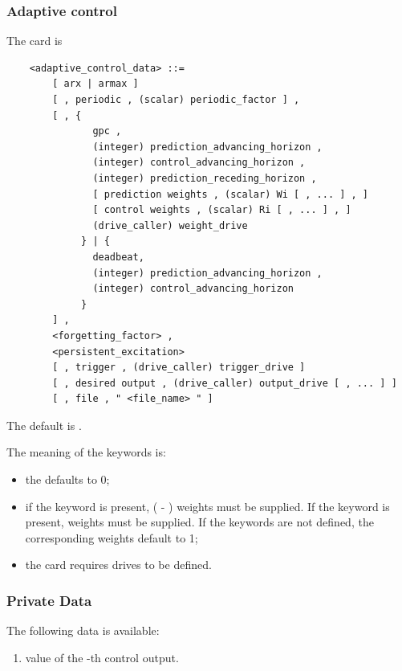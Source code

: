 \subsubsection{Adaptive control}
The  card is
\begin{verbatim}
    <adaptive_control_data> ::=
        [ arx | armax ]
        [ , periodic , (scalar) periodic_factor ] ,
        [ , { 
               gpc ,
               (integer) prediction_advancing_horizon ,
               (integer) control_advancing_horizon ,
               (integer) prediction_receding_horizon ,
               [ prediction weights , (scalar) Wi [ , ... ] , ]
               [ control weights , (scalar) Ri [ , ... ] , ]
               (drive_caller) weight_drive
             } | { 
               deadbeat,
               (integer) prediction_advancing_horizon ,
               (integer) control_advancing_horizon
             }
        ] ,
        <forgetting_factor> ,
        <persistent_excitation>
        [ , trigger , (drive_caller) trigger_drive ]
        [ , desired output , (drive_caller) output_drive [ , ... ] ]
        [ , file , " <file_name> " ]            
\end{verbatim}
The default is .

The meaning of the keywords is:
\begin{itemize}
\item the  defaults to 0;

\item if the keyword  is present,
( - ) 
weights  must be supplied.
If the keyword  is present,
 weights  must be supplied.
If the keywords are not defined, the corresponding weights
default to 1;

\item the 
card requires  drives to be defined.
\end{itemize}

\subsubsection{Private Data}
The following data is available:
\begin{enumerate}
\item {} value of the -th control output.
\end{enumerate}

